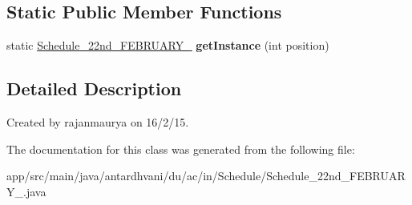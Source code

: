 \subsection*{Static Public Member Functions}
\begin{DoxyCompactItemize}
\item 
\hypertarget{classantardhvani_1_1du_1_1ac_1_1in_1_1_schedule_1_1_schedule__22nd___f_e_b_r_u_a_r_y__2015_a78585fdcb97b536aace508ee94b47ad4}{}static \hyperlink{classantardhvani_1_1du_1_1ac_1_1in_1_1_schedule_1_1_schedule__22nd___f_e_b_r_u_a_r_y__2015}{Schedule\+\_\+22nd\+\_\+\+F\+E\+B\+R\+U\+A\+R\+Y\+\_} {\bfseries get\+Instance} (int position)\label{classantardhvani_1_1du_1_1ac_1_1in_1_1_schedule_1_1_schedule__22nd___f_e_b_r_u_a_r_y__2015_a78585fdcb97b536aace508ee94b47ad4}

\end{DoxyCompactItemize}


\subsection{Detailed Description}
Created by rajanmaurya on 16/2/15. 

The documentation for this class was generated from the following file\+:\begin{DoxyCompactItemize}
\item 
app/src/main/java/antardhvani/du/ac/in/\+Schedule/Schedule\+\_\+22nd\+\_\+\+F\+E\+B\+R\+U\+A\+R\+Y\+\_.\+java\end{DoxyCompactItemize}
